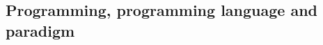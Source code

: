 \documentclass[10pt,compress]{beamer} %
\begin{document}




\subsection{Programming, programming language and paradigm}
\end{document}
